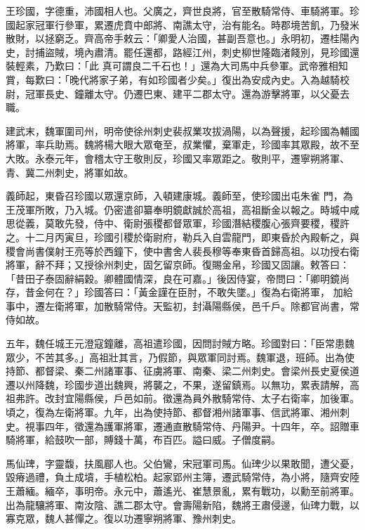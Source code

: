 
\begin{pinyinscope}

 王珍國，字德重，沛國相人也。父廣之，齊世良將，官至散騎常侍、車騎將軍。珍國起家冠軍行參軍，累遷虎賁中郎將、南譙太守，治有能名。時郡境苦飢，乃發米散財，以拯窮乏。齊高帝手敕云：「卿愛人治國，甚副吾意也。」永明初，遷桂陽內史，討捕盜賊，境內肅清。罷任還都，路經江州，刺史柳世隆臨渚餞別，見珍國還裝輕素，乃歎曰：「此
 真可謂良二千石也！」還為大司馬中兵參軍。武帝雅相知賞，每歎曰：「晚代將家子弟，有如珍國者少矣。」復出為安成內史。入為越騎校尉，冠軍長史、鐘離太守。仍遷巴東、建平二郡太守。還為游擊將軍，以父憂去職。



 建武末，魏軍圍司州，明帝使徐州刺史裴叔業攻拔渦陽，以為聲援，起珍國為輔國將軍，率兵助焉。魏將楊大眼大眾奄至，叔業懼，棄軍走，珍國率其眾殿，故不至大敗。永泰元年，會稽太守王敬則反，珍國又率眾距之。敬則平，遷寧朔將軍、青、冀二州刺史，將軍如故。



 義師起，東昏召珍國以眾還京師，入頓建康城。義師至，使珍國出屯朱雀
 門，為王茂軍所敗，乃入城。仍密遣卻纂奉明鏡獻誠於高祖，高祖斷金以報之。時城中咸思從義，莫敢先發，侍中、衛尉張稷都督眾軍，珍國潛結稷腹心張齊要稷，稷許之。十二月丙寅旦，珍國引稷於衛尉府，勒兵入自雲龍門，即東昏於內殿斬之，與稷會尚書僕射王亮等於西鐘下，使中書舍人裴長穆等奉東昏首歸高祖。以功授右衛將軍，辭不拜；又授徐州刺史，固乞留京師。復賜金帛，珍國又固讓。敕答曰：「昔田子泰固辭絹穀。卿體國情深，良在可嘉。」後因侍宴，帝問曰：「卿明鏡尚存，昔金何在？」珍國答曰：「黃金謹在臣肘，不敢失墜。」復為右衛將軍，
 加給事中，遷左衛將軍，加散騎常侍。天監初，封灄陽縣侯，邑千戶。除都官尚書，常侍如故。



 五年，魏任城王元澄寇鐘離，高祖遣珍國，因問討賊方略。珍國對曰：「臣常患魏眾少，不苦其多。」高祖壯其言，乃假節，與眾軍同討焉。魏軍退，班師。出為使持節、都督梁、秦二州諸軍事、征虜將軍、南秦、梁二州刺史。會梁州長史夏侯道遷以州降魏，珍國步道出魏興，將襲之，不果，遂留鎮焉。以無功，累表請解，高祖弗許。改封宜陽縣侯，戶邑如前。徵還為員外散騎常侍、太子右衛率，加後軍。頃之，復為左衛將軍。九年，出為使持節、都督湘州諸軍事、信武將軍、湘州刺
 史。視事四年，徵還為護軍將軍，遷通直散騎常侍、丹陽尹。十四年，卒。詔贈車騎將軍，給鼓吹一部，賻錢十萬，布百匹。謚曰威。子僧度嗣。



 馬仙琕，字靈馥，扶風郿人也。父伯鸞，宋冠軍司馬。仙琕少以果敢聞，遭父憂，毀瘠過禮，負土成墳，手植松柏。起家郢州主簿，遷武騎常侍，為小將，隨齊安陸王蕭緬。緬卒，事明帝。永元中，蕭遙光、崔慧景亂，累有戰功，以勳至前將軍。出為龍驤將軍、南汝陰、譙二郡太守。會壽陽新陷，魏將王肅侵邊，仙琕力戰，以寡克眾，魏人甚憚之。復以功遷寧朔將軍、豫州刺史。




\end{pinyinscope}

